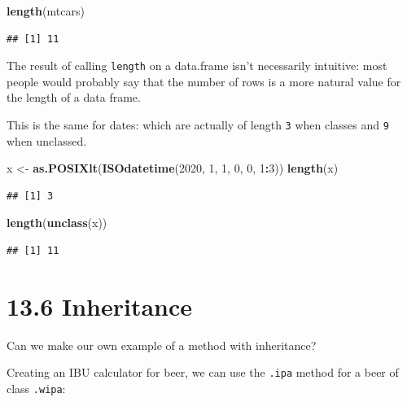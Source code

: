 \documentclass[]{book}
\newenvironment{Shaded}{\begin{snugshade}}{\end{snugshade}}
\newcommand{\DecValTok}[1]{\textcolor[rgb]{0.00,0.00,0.81}{#1}}
\newcommand{\KeywordTok}[1]{\textcolor[rgb]{0.13,0.29,0.53}{\textbf{#1}}}
\newcommand{\NormalTok}[1]{#1}
\newcommand{\OperatorTok}[1]{\textcolor[rgb]{0.81,0.36,0.00}{\textbf{#1}}}
\newcommand{\StringTok}[1]{\textcolor[rgb]{0.31,0.60,0.02}{#1}}
\begin{document}
\begin{Shaded}
\begin{Highlighting}[]
\KeywordTok{length}\NormalTok{(mtcars)}
\end{Highlighting}
\end{Shaded}

\begin{verbatim}
## [1] 11
\end{verbatim}

The result of calling \texttt{length} on a data.frame isn't necessarily intuitive: most people would probably say that the number of rows is a more natural value for the length of a data frame.

This is the same for dates: which are actually of length \texttt{3} when classes and \texttt{9} when unclassed.

\begin{Shaded}
\begin{Highlighting}[]
\NormalTok{x <-}\StringTok{ }\KeywordTok{as.POSIXlt}\NormalTok{(}\KeywordTok{ISOdatetime}\NormalTok{(}\DecValTok{2020}\NormalTok{, }\DecValTok{1}\NormalTok{, }\DecValTok{1}\NormalTok{, }\DecValTok{0}\NormalTok{, }\DecValTok{0}\NormalTok{, }\DecValTok{1}\OperatorTok{:}\DecValTok{3}\NormalTok{))}
\KeywordTok{length}\NormalTok{(x)}
\end{Highlighting}
\end{Shaded}

\begin{verbatim}
## [1] 3
\end{verbatim}

\begin{Shaded}
\begin{Highlighting}[]
\KeywordTok{length}\NormalTok{(}\KeywordTok{unclass}\NormalTok{(x))}
\end{Highlighting}
\end{Shaded}

\begin{verbatim}
## [1] 11
\end{verbatim}

\hypertarget{inheritance}{%
\section*{13.6 Inheritance}\label{inheritance}}

Can we make our own example of a method with inheritance?

Creating an IBU calculator for beer, we can use the \texttt{.ipa} method for a beer of class \texttt{.wipa}:
\end{document}
